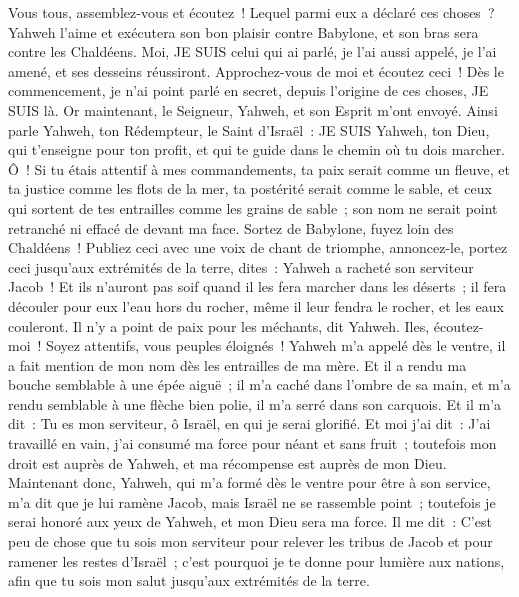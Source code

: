 \begin{multicols}{2}
Vous tous, assemblez-vous et écoutez~! Lequel parmi eux a déclaré ces choses~? Yahweh l'aime et exécutera son bon plaisir contre Babylone, et son bras sera contre les Chaldéens.
Moi, JE SUIS celui qui ai parlé, je l'ai aussi appelé, je l'ai amené, et ses desseins réussiront.
Approchez-vous de moi et écoutez ceci~! Dès le commencement, je n'ai point parlé en secret, depuis l'origine de ces choses, JE SUIS là. Or maintenant, le Seigneur, Yahweh, et son Esprit m'ont envoyé.
Ainsi parle Yahweh, ton Rédempteur, le Saint d'Israël~: JE SUIS Yahweh, ton Dieu, qui t'enseigne pour ton profit, et qui te guide dans le chemin où tu dois marcher.
Ô~! Si tu étais attentif à mes commandements, ta paix serait comme un fleuve, et ta justice comme les flots de la mer,
ta postérité serait comme le sable, et ceux qui sortent de tes entrailles comme les grains de sable~; son nom ne serait point retranché ni effacé de devant ma face.
Sortez de Babylone, fuyez loin des Chaldéens~! Publiez ceci avec une voix de chant de triomphe, annoncez-le, portez ceci jusqu'aux extrémités de la terre, dites~: Yahweh a racheté son serviteur Jacob~!
Et ils n'auront pas soif quand il les fera marcher dans les déserts~; il fera découler pour eux l'eau hors du rocher, même il leur fendra le rocher, et les eaux couleront.
Il n'y a point de paix pour les méchants, dit Yahweh.
\VerseOne{}Iles, écoutez-moi~! Soyez attentifs, vous peuples éloignés~! Yahweh m'a appelé dès le ventre, il a fait mention de mon nom dès les entrailles de ma mère.
Et il a rendu ma bouche semblable à une épée aiguë~; il m'a caché dans l'ombre de sa main, et m'a rendu semblable à une flèche bien polie, il m'a serré dans son carquois.
Et il m'a dit~: Tu es mon serviteur, ô Israël, en qui je serai glorifié.
Et moi j'ai dit~: J'ai travaillé en vain, j'ai consumé ma force pour néant et sans fruit~; toutefois mon droit est auprès de Yahweh, et ma récompense est auprès de mon Dieu.
Maintenant donc, Yahweh, qui m'a formé dès le ventre pour être à son service, m'a dit que je lui ramène Jacob, mais Israël ne se rassemble point~; toutefois je serai honoré aux yeux de Yahweh, et mon Dieu sera ma force.
Il me dit~: C'est peu de chose que tu sois mon serviteur pour relever les tribus de Jacob et pour ramener les restes d'Israël~; c'est pourquoi je te donne pour lumière aux nations, afin que tu sois mon salut jusqu'aux extrémités de la terre.

\end{multicols}
